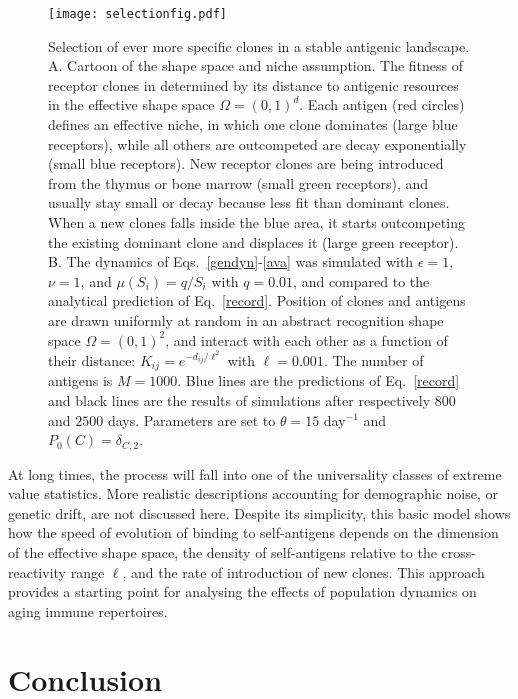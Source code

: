 \documentclass[aps,pre,twocolumn,superscriptaddress,groupedaddress]{revtex4}
\newcommand{\<}{\langle}
\renewcommand{\>}{\rangle}
\begin{document}
\begin{figure} 
\begin{center}
\texttt{[image: selectionfig.pdf]}
\caption{Selection of ever more specific clones in a stable antigenic landscape. 
A. Cartoon of the shape space and niche assumption. The fitness of receptor clones in determined by its distance to antigenic resources in the effective shape space $\Omega=(0,1)^d$. Each antigen (red circles) defines an effective niche, in which one clone dominates (large blue receptors), while all others are outcompeted are decay exponentially (small blue receptors). New receptor clones are being introduced from the thymus or bone marrow (small green receptors), and usually stay small or decay because less fit than dominant clones. When a new clones falls inside the blue area, it starts outcompeting the existing dominant clone and displaces it (large green receptor).
B. The dynamics of Eqs.~\ref{gendyn}-\ref{ava} was simulated with $\epsilon=1$, $\nu=1$, and $\mu(S_i)=q/S_i$ with $q=0.01$, and compared to the analytical prediction of Eq.~\ref{record}.
Position of clones and antigens are drawn uniformly at random in an abstract recognition shape space $\Omega=(0,1)^2$, and interact with each other as a function of their distance: $K_{ij}=e^{-d_{ij}/\ell^2}$ with $\ell=0.001$. The number of antigens is $M=1000$. Blue lines are the predictions of Eq.~\ref{record} and black lines are the results of simulations after respectively $800$ and $2500$ days. Parameters are set to $\theta=15$ day${}^{-1}$ and $P_{0}(C)=\delta_{C,2}$.}
\label{selection}
\end{center}
\end{figure}  

At long times, the process will fall into one of the universality classes of extreme value statistics. More realistic descriptions accounting for demographic noise, or genetic drift, are not discussed here. Despite its simplicity, this basic model shows how the speed of evolution of binding to self-antigens depends on the dimension of the effective shape space, the density of self-antigens relative to the cross-reactivity range $\ell$, and the rate of introduction of new clones.
This approach provides a starting point for analysing the effects of population dynamics on aging immune repertoires.
 
 \section{Conclusion}
 
\end{document}
